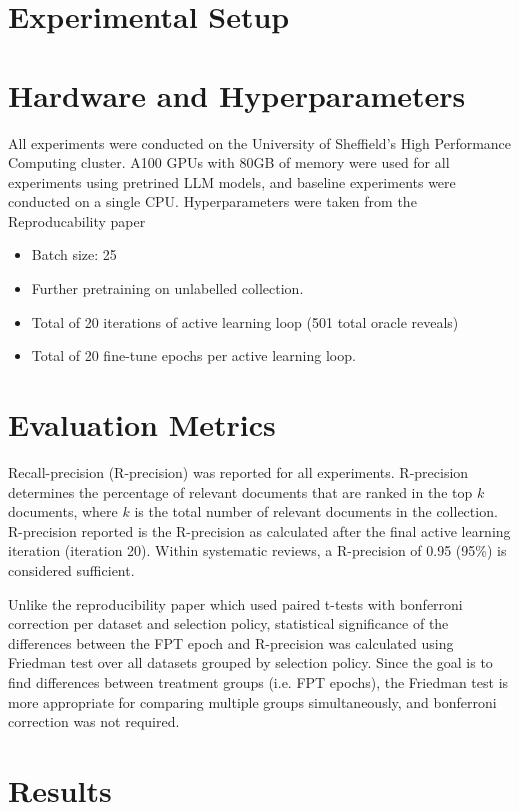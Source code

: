 \documentclass{article}
\begin{document}
\section{Experimental Setup}

\section{Hardware and Hyperparameters}

All experiments were conducted on the University of Sheffield's High Performance Computing cluster. A100 GPUs with 80GB of memory were used for all experiments using pretrined LLM models, and baseline experiments were conducted on a single CPU. Hyperparameters
were taken from the Reproducability paper

\begin{itemize}
    \item Batch size: 25
    \item Further pretraining on unlabelled collection.
    \item Total of 20 iterations of active learning loop (501 total oracle reveals)
    \item Total of 20 fine-tune epochs per active learning loop.
\end{itemize}

\section{Evaluation Metrics}

Recall-precision (R-precision) was reported for all experiments. R-precision determines the percentage of relevant documents that are ranked in the top $k$ documents, where $k$ is the total number of relevant documents in the collection. R-precision reported is the R-precision as calculated after the final active learning iteration (iteration 20). Within systematic reviews, a R-precision of 0.95 (95\%) is considered sufficient.

Unlike the reproducibility paper which used paired t-tests with bonferroni correction per dataset and selection policy, statistical significance of the differences between the FPT epoch and R-precision was calculated using Friedman test over all datasets grouped by selection policy. Since the goal is to find differences between treatment groups (i.e. FPT epochs), the Friedman test is more appropriate for comparing multiple groups simultaneously, and bonferroni correction was not required.

\section{Results}
\end{document}
